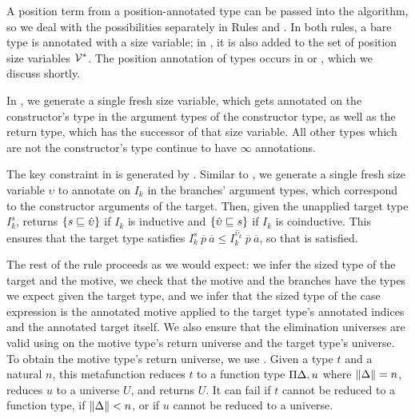 A position term from a position-annotated \cofixpoint type can be passed into the algorithm, so we deal with the possibilities separately in Rules  and .
In both rules, a bare \coinductive type is annotated with a size variable; in , it is also added to the set of position size variables $\mathcal{V}^*$.
The position annotation of \coinductive types occurs in  or , which we discuss shortly.

In , we generate a single fresh size variable, which gets annotated on the constructor's \coinductive type in the argument types of the constructor type, as well as the return type, which has the successor of that size variable.
All other \coinductive types which are not the constructor's \coinductive type continue to have $\infty$ annotations.

The key constraint in  is generated by \casesize.
Similar to , we generate a single fresh size variable $\upsilon$ to annotate on $I_k$ in the branches' argument types, which correspond to the constructor arguments of the target.
Then, given the unapplied target type $I_k^s$, \casesize returns $\{s \sqsubseteq \hat{\upsilon}\}$ if $I_k$ is inductive and $\{\hat{\upsilon} \sqsubseteq s\}$ if $I_k$ is coinductive.
This ensures that the target type satisfies $I_k^s ~ \overline{p} ~ \overline{a} \leq I_k^{\hat{\upsilon}_k} ~ \overline{p} ~ \overline{a}$, so that  is satisfied.

The rest of the rule proceeds as we would expect: we infer the sized type of the target and the motive, we check that the motive and the branches have the types we expect given the target type, and we infer that the sized type of the case expression is the annotated motive applied to the target type's annotated indices and the annotated target itself.
We also ensure that the elimination universes are valid using \elim on the motive type's return universe and the target type's universe.
To obtain the motive type's return universe, we use \decompose.
Given a type $t$ and a natural $n$, this metafunction reduces $t$ to a function type $\Pi \Delta \mathpunct{.} u$ where $\lVert\Delta\rVert = n$, reduces $u$ to a universe $U$, and returns $U$.
It can fail if $t$ cannot be reduced to a function type, if $\lVert\Delta\rVert < n$, or if $u$ cannot be reduced to a universe.

